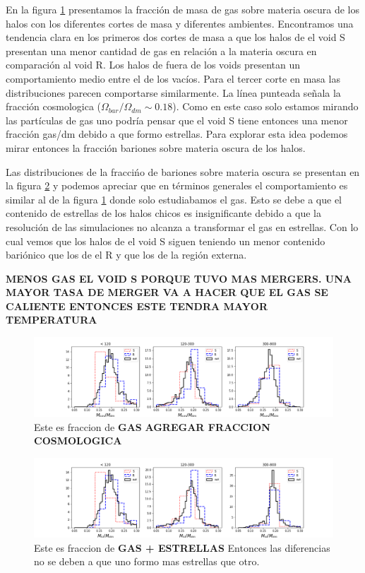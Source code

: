 En la figura \ref{Gs/Dm} presentamos la fracci\'on de masa de gas sobre materia oscura de los halos con los diferentes cortes de masa y diferentes ambientes. Encontramos una tendencia clara en los primeros dos cortes de masa a que los halos de el void S presentan una menor cantidad de gas en relaci\'on a la materia oscura en comparaci\'on al void R. Los halos de fuera de los voids presentan un comportamiento medio entre el de los vac\'ios. Para el tercer corte en masa las distribuciones parecen comportarse similarmente. La l\'inea punteada se\~nala la fracci\'on cosmologica ($\Omega_{bar}/\Omega_{dm}\sim 0.18$). Como en este caso solo estamos mirando las part\'iculas de gas uno podr\'ia pensar que el void S tiene entonces una menor fracci\'on gas/dm debido a que formo estrellas. Para explorar esta idea podemos mirar entonces la fracci\'on bariones sobre materia oscura de los halos.

Las distribuciones de la fracci\'no de bariones sobre materia oscura se presentan en la figura \ref{Bar/Dm} y podemos apreciar que en t\'erminos generales el comportamiento es similar al de la figura \ref{Gs/Dm} donde solo estudiabamos el gas. Esto se debe a que el contenido de estrellas de los halos chicos es insignificante debido a que la resoluci\'on de las simulaciones no alcanza a transformar el gas en estrellas. Con lo cual vemos que los halos de el void S siguen teniendo un menor contenido bari\'onico que los de el R y que los de la regi\'on externa. 

\textbf{MENOS GAS EL VOID S PORQUE TUVO MAS MERGERS. UNA MAYOR TASA DE MERGER VA A HACER QUE EL GAS SE CALIENTE ENTONCES ESTE TENDRA MAYOR TEMPERATURA}


\begin{figure}[h]
\centering
\includegraphics[width=\textwidth]{Figures/Fraccion_cortemasa1.png}
\decoRule
\caption[asd]{Este es fraccion de \textbf{GAS} \textbf{AGREGAR FRACCION COSMOLOGICA}}
\label{Gs/Dm}
\end{figure}


\begin{figure}[h]
\centering
\includegraphics[width=\textwidth]{Figures/Fraccion_cortemasa2.png}
\decoRule
\caption[asd]{Este es fraccion de \textbf{GAS + ESTRELLAS} Entonces las diferencias no se deben a que uno formo mas estrellas que otro. }
\label{Bar/Dm}
\end{figure}


